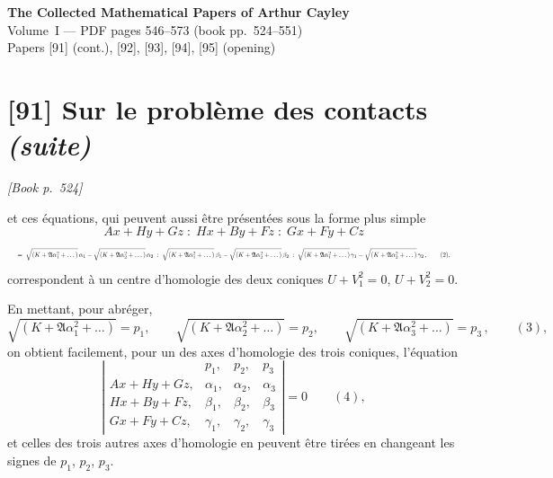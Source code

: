 \documentclass[11pt]{article}
\begin{document}
\begin{center}
{\Large\bfseries The Collected Mathematical Papers of Arthur Cayley}\\[0.4em]
{\large Volume~I --- PDF pages 546--573 (book pp.~524--551)}\\[0.4em]
{\normalsize Papers [91] (cont.), [92], [93], [94], [95] (opening)}
\end{center}

\vspace{1em}


\section*{[91] Sur le probl\`eme des contacts \emph{(suite)}}

\noindent\textit{[Book p.~524]}\hfill

\smallskip

\noindent et ces \'equations, qui peuvent aussi \^etre pr\'esent\'ees sous la forme plus simple
\[
A x + H y + G z\;:\;H x + B y + F z\;:\;G x + F y + C z
\]
\[ \resizebox{\textwidth}{!}{$\displaystyle
=\;\sqrt{(K+\mathfrak{A}\alpha_{1}^{2}+\dots)}\,\alpha_{1} - \sqrt{(K+\mathfrak{A}\alpha_{2}^{2}+\dots)}\,\alpha_{2}\;:\;\sqrt{(K+\mathfrak{A}\alpha_{1}^{2}+\dots)}\,\beta_{1} - \sqrt{(K+\mathfrak{A}\alpha_{2}^{2}+\dots)}\,\beta_{2}\;:\;\sqrt{(K+\mathfrak{A}\alpha_{1}^{2}+\dots)}\,\gamma_{1} - \sqrt{(K+\mathfrak{A}\alpha_{2}^{2}+\dots)}\,\gamma_{2}\,,\qquad (2),
$} \]
correspondent \`a un centre d'homologie des deux coniques $U + V_{1}^{2} = 0$, $U + V_{2}^{2} = 0$.

En mettant, pour abr\'eger,
\[
\sqrt{(K+\mathfrak{A}\alpha_{1}^{2}+\dots)}=p_{1},\qquad \sqrt{(K+\mathfrak{A}\alpha_{2}^{2}+\dots)}=p_{2},\qquad \sqrt{(K+\mathfrak{A}\alpha_{3}^{2}+\dots)}=p_{3}\,,\qquad (3),
\]
on obtient facilement, pour un des axes d'homologie des trois coniques, l'\'equation
\[
\left|\begin{array}{cccc}
 & p_{1}, & p_{2}, & p_{3} \\
A x + H y + G z, & \alpha_{1}, & \alpha_{2}, & \alpha_{3} \\
H x + B y + F z, & \beta_{1}, & \beta_{2}, & \beta_{3} \\
G x + F y + C z, & \gamma_{1}, & \gamma_{2}, & \gamma_{3}
\end{array}\right| = 0 \qquad (4),
\]
et celles des trois autres axes d'homologie en peuvent \^etre tir\'ees en changeant les signes de $p_{1}$, $p_{2}$, $p_{3}$.
\end{document}
